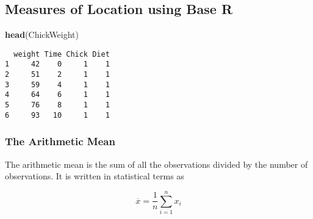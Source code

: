 \documentclass[12pt,]{article}
\newenvironment{Shaded}{\begin{snugshade}}{\end{snugshade}}
\newcommand{\KeywordTok}[1]{\textcolor[rgb]{0.13,0.29,0.53}{\textbf{#1}}}
\newcommand{\NormalTok}[1]{#1}
\theoremstyle{definition}
\theoremstyle{definition}
\theoremstyle{definition}
\theoremstyle{remark}
\begin{document}
\hypertarget{htmlwidget-c17f8236727b8c3f2a17}{}

\subsection{Measures of Location using Base
R}\label{measures-of-location-using-base-r}

\begin{Shaded}
\begin{Highlighting}[]
\KeywordTok{head}\NormalTok{(ChickWeight)}
\end{Highlighting}
\end{Shaded}

\begin{verbatim}
  weight Time Chick Diet
1     42    0     1    1
2     51    2     1    1
3     59    4     1    1
4     64    6     1    1
5     76    8     1    1
6     93   10     1    1
\end{verbatim}

\subsubsection{The Arithmetic Mean}\label{the-arithmetic-mean}

The arithmetic mean is the sum of all the observations divided by the
number of observations. It is written in statistical terms as

\[\overline{x} = \frac{1}{n}\sum^n_{i=1}x_i\]
\end{document}
